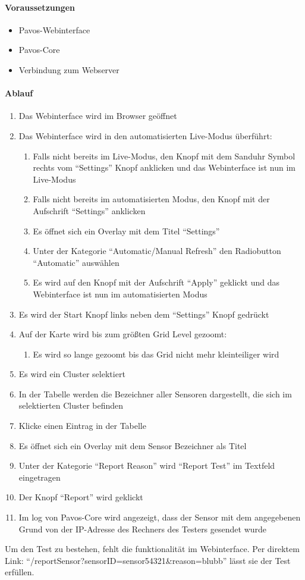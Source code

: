 \paragraph{Voraussetzungen}
\begin{itemize}
\item Pavos-Webinterface
\item Pavos-Core
\item Verbindung zum Webserver
\end{itemize}
\paragraph{Ablauf}
\begin{enumerate}
\item Das Webinterface wird im Browser geöffnet
\item Das Webinterface wird in den automatisierten Live-Modus überführt:
\begin{enumerate}
\item Falls nicht bereits im Live-Modus, den Knopf mit dem Sanduhr Symbol rechts vom ``Settings'' Knopf anklicken und das Webinterface ist nun im Live-Modus
\item Falls nicht bereits im automatisierten Modus, den Knopf mit der Aufschrift ``Settings'' anklicken
\item Es öffnet sich ein Overlay mit dem Titel ``Settings''
\item Unter der Kategorie ``Automatic/Manual Refresh'' den Radiobutton ``Automatic'' auswählen
\item Es wird auf den Knopf mit der Aufschrift ``Apply'' geklickt und das Webinterface ist nun im automatisierten Modus
\end{enumerate} 
\item Es wird der Start Knopf links neben dem ``Settings'' Knopf gedrückt
\item Auf der Karte wird bis zum größten Grid Level gezoomt:
\begin{enumerate}
\item Es wird so lange gezoomt bis das Grid nicht mehr kleinteiliger wird
\end{enumerate}
\item Es wird ein Cluster selektiert
\item In der Tabelle werden die Bezeichner aller Sensoren dargestellt, die sich im selektierten Cluster befinden
\item Klicke einen Eintrag in der Tabelle
\item Es öffnet sich ein Overlay mit dem Sensor Bezeichner als Titel
\item Unter der Kategorie ``Report Reason'' wird ``Report Test'' im Textfeld eingetragen
\item Der Knopf ``Report'' wird geklickt
\item Im log von Pavos-Core wird angezeigt, dass der Sensor mit dem angegebenen Grund von der IP-Adresse des Rechners des Testers gesendet wurde
\end{enumerate}
\szenarioBad
Um den Test zu bestehen, fehlt die funktionalität im Webinterface.
Per direktem Link: ``/reportSensor?sensorID=sensor54321&reason=blubb'' lässt sie der Test erfüllen.

